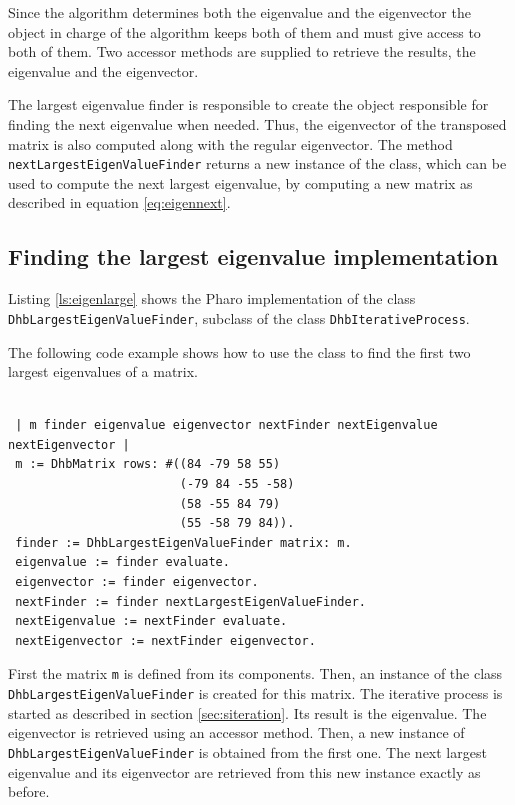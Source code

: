 \documentclass[twoside]{book}
\begin{document}
Since the algorithm determines both the eigenvalue and the
eigenvector the object in charge of the algorithm keeps both of
them and must give access to both of them. Two accessor methods
are supplied to retrieve the results, the eigenvalue and the
eigenvector.

The largest eigenvalue finder is responsible to create the object
responsible for finding the next eigenvalue when needed. Thus, the
eigenvector of the transposed matrix is also computed along with
the regular eigenvector. The method {\tt
nextLargestEigenValueFinder} returns a new instance of the class,
which can be used to compute the next largest eigenvalue, by
computing a new matrix as described in equation
\ref{eq:eigennext}.

\subsection{Finding the largest eigenvalue  implementation} Listing \ref{ls:eigenlarge} shows the Pharo
implementation of the  class {\tt DhbLargestEigenValueFinder},
subclass of the class {\tt DhbIterativeProcess}.

The following code example shows how to use the class to find the
first two largest eigenvalues of a matrix.
\begin{codeExample}
\begin{verbatim}

 | m finder eigenvalue eigenvector nextFinder nextEigenvalue nextEigenvector |
 m := DhbMatrix rows: #((84 -79 58 55)
                        (-79 84 -55 -58)
                        (58 -55 84 79)
                        (55 -58 79 84)).
 finder := DhbLargestEigenValueFinder matrix: m.
 eigenvalue := finder evaluate.
 eigenvector := finder eigenvector.
 nextFinder := finder nextLargestEigenValueFinder.
 nextEigenvalue := nextFinder evaluate.
 nextEigenvector := nextFinder eigenvector.
\end{verbatim}
\end{codeExample}
First the matrix {\tt m} is defined from its components. Then, an
instance of the class {\tt DhbLargestEigenValueFinder} is created
for this matrix. The iterative process is started as described in
section \ref{sec:siteration}. Its result is the eigenvalue. The
eigenvector is retrieved using an accessor method. Then, a new
instance of {\tt DhbLargestEigenValueFinder} is obtained from the
first one. The next largest eigenvalue and its eigenvector are
retrieved from this new instance exactly as before.
\end{document}
